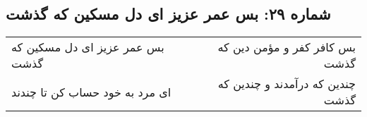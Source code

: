 \begin{center}
\section*{شماره ۲۹: بس عمر عزیز ای دل مسکین که گذشت}
\label{sec:029}
\begin{longtable}{l p{0.5cm} r}
بس عمر عزیز ای دل مسکین که گذشت
&&
بس کافر کفر و مؤمن دین که گذشت
\\
ای مرد به خود حساب کن تا چندند
&&
چندین که درآمدند و چندین که گذشت
\\
\end{longtable}
\end{center}
